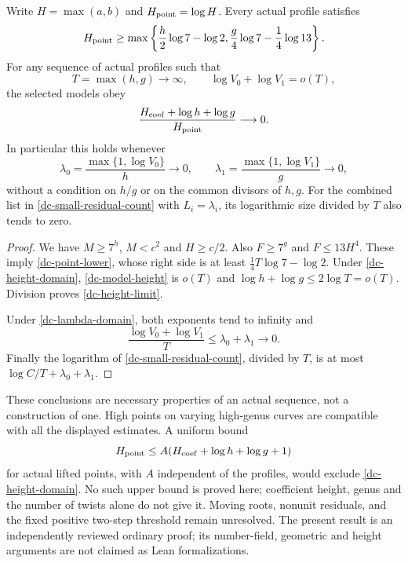 \begin{corollary}
\label{dc-height-separation}
Write $H=\max(a,b)$ and $H_{\rm point}=\log H$. Every actual
profile satisfies
\begin{equation}\label{dc-point-lower}
 H_{\rm point}\ge
 \max\left\{\frac h2\log7-\log2,
             \frac g4\log7-\frac14\log13\right\}.
\end{equation}
For any sequence of actual profiles such that
\begin{equation}\label{dc-height-domain}
 T=\max(h,g)\longrightarrow\infty,\qquad
 \log V_0+\log V_1=o(T),
\end{equation}
the selected models obey
\begin{equation}\label{dc-height-limit}
 \frac{H_{\rm coef}+\log h+\log g}{H_{\rm point}}
 \longrightarrow0.
\end{equation}
In particular this holds whenever
\begin{equation}\label{dc-lambda-domain}
 \lambda_0=\frac{\max\{1,\log V_0\}}h\longrightarrow0,
 \qquad
 \lambda_1=\frac{\max\{1,\log V_1\}}g\longrightarrow0,
\end{equation}
without a condition on $h/g$ or on the common divisors of $h,g$.
For the combined list in \eqref{dc-small-residual-count} with
$L_i=\lambda_i$, its logarithmic size divided by $T$ also tends to zero.
\end{corollary}
\begin{proof}
We have $M\ge7^h$, $M<c^2$ and $H\ge c/2$.
Also $F\ge7^g$ and $F\le13H^4$. These imply
\eqref{dc-point-lower}, whose right side is at least
$\tfrac14T\log7-\log2$. Under \eqref{dc-height-domain},
\eqref{dc-model-height} is $o(T)$ and
$\log h+\log g\le2\log T=o(T)$. Division proves
\eqref{dc-height-limit}.

Under \eqref{dc-lambda-domain}, both exponents tend to infinity and
\[
 \frac{\log V_0+\log V_1}{T}\le\lambda_0+\lambda_1\longrightarrow0.
\]
Finally the logarithm of \eqref{dc-small-residual-count}, divided
by $T$, is at most $\log C/T+\lambda_0+\lambda_1$.
\end{proof}

These conclusions are necessary properties of an actual sequence,
not a construction of one. High points on varying high-genus curves
are compatible with all the displayed estimates. A uniform bound
\[
 H_{\rm point}\le A(H_{\rm coef}+\log h+\log g+1)
\]
for actual lifted points, with $A$ independent of the profiles, would
exclude \eqref{dc-height-domain}. No such upper bound is proved here;
coefficient height, genus and the number of twists alone do not give it.
Moving roots, nonunit residuals, and the fixed positive two-step
threshold remain unresolved. The present result is an independently
reviewed ordinary proof; its number-field, geometric and height
arguments are not claimed as Lean formalizations.
